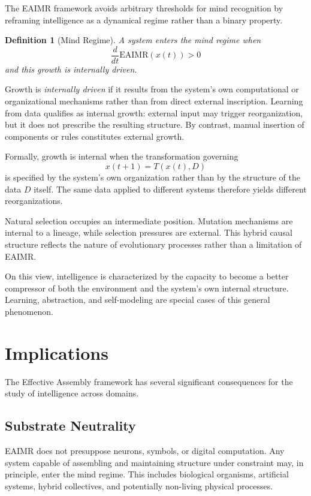 \documentclass[11pt,letterpaper]{article}
\newtheorem{definition}{Definition}
\begin{document}
The EAIMR framework avoids arbitrary thresholds for mind recognition by reframing intelligence as a dynamical regime rather than a binary property.

\begin{definition}[Mind Regime]
A system enters the \emph{mind regime} when
\[
\frac{d}{dt}\mathrm{EAIMR}(x(t)) > 0
\]
and this growth is internally driven.
\end{definition}

Growth is \emph{internally driven} if it results from the system’s own computational or organizational mechanisms rather than from direct external inscription. Learning from data qualifies as internal growth: external input may trigger reorganization, but it does not prescribe the resulting structure. By contrast, manual insertion of components or rules constitutes external growth.

Formally, growth is internal when the transformation governing
\[
x(t+1) = T(x(t), D)
\]
is specified by the system’s own organization rather than by the structure of the data $D$ itself. The same data applied to different systems therefore yields different reorganizations.

Natural selection occupies an intermediate position. Mutation mechanisms are internal to a lineage, while selection pressures are external. This hybrid causal structure reflects the nature of evolutionary processes rather than a limitation of EAIMR.

On this view, intelligence is characterized by the capacity to become a better compressor of both the environment and the system’s own internal structure. Learning, abstraction, and self-modeling are special cases of this general phenomenon.

\section{Implications}

The Effective Assembly framework has several significant consequences for the study of intelligence across domains.

\subsection{Substrate Neutrality}

EAIMR does not presuppose neurons, symbols, or digital computation. Any system capable of assembling and maintaining structure under constraint may, in principle, enter the mind regime. This includes biological organisms, artificial systems, hybrid collectives, and potentially non-living physical processes.
\end{document}
